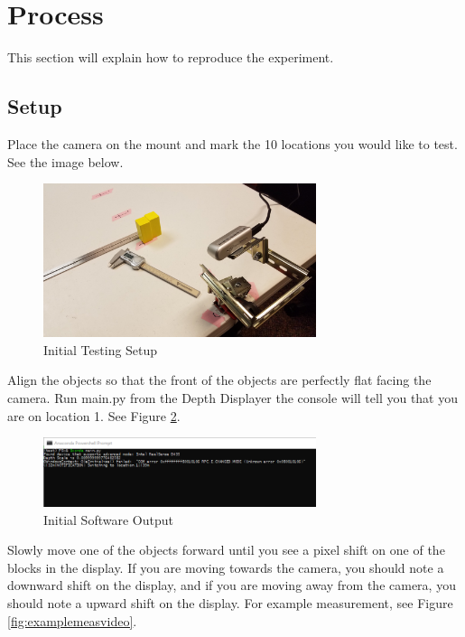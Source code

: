\documentclass{article}
\begin{document}
			\newpage
			\section{Process}
				This section will explain how to reproduce the experiment.
				\subsection{Setup}
					Place the camera on the mount and mark the 10 locations you would like to test. See the image below.
					
					\begin{figure}[h]
						\includegraphics[width=8cm]{./images/initial_setup.jpg}
						\centering
						\caption{Initial Testing Setup}
						\label{fig:initsetup}
					\end{figure}
				
					Align the objects so that the front of the objects are perfectly flat facing the camera. Run main.py from the Depth Displayer the console will tell you that you are on location 1. See Figure \ref{fig:consoleinit}.
					
					\begin{figure}[h]
						\includegraphics[width=8cm]{./images/code_initial_console_output.png}
						\centering
						\caption{Initial Software Output}
						\label{fig:consoleinit}
					\end{figure}
				
					\newpage
					Slowly move one of the objects forward until you see a pixel shift on one of the blocks in the display. If you are moving towards the camera, you should note a downward shift on the display, and if you are moving away from the camera, you should note a upward shift on the display. For example measurement, see Figure \ref{fig:examplemeasvideo}.
					
\end{document}
